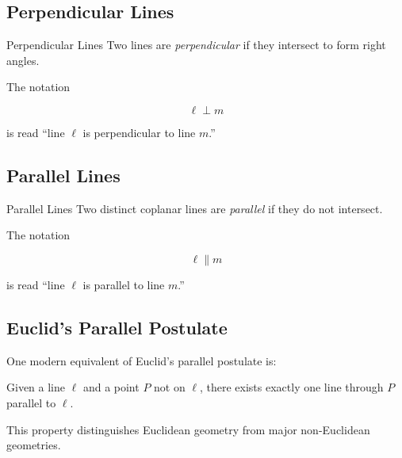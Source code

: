 \subsection{Perpendicular Lines}
\label{subsec:perpendicular-lines-euclidean}

\begin{definitionbox}{Perpendicular Lines}
Two lines are \emph{perpendicular} if they intersect to form right angles.
\end{definitionbox}

The notation

\[ \ell\perp m \]

is read ``line \(\ell\) is perpendicular to line \(m\).''

\subsection{Parallel Lines}
\label{subsec:parallel-lines-euclidean}

\begin{definitionbox}{Parallel Lines}
Two distinct coplanar lines are \emph{parallel} if they do not intersect.
\end{definitionbox}

The notation

\[ \ell\parallel m \]

is read ``line \(\ell\) is parallel to line \(m\).''

\subsection{Euclid's Parallel Postulate}
\label{subsec:euclid-parallel-postulate}

One modern equivalent of Euclid's parallel postulate is:

\begin{importantbox}
Given a line \(\ell\) and a point \(P\) not on \(\ell\), there exists exactly
one line through \(P\) parallel to \(\ell\).
\end{importantbox}

This property distinguishes Euclidean geometry from major non-Euclidean
geometries.

